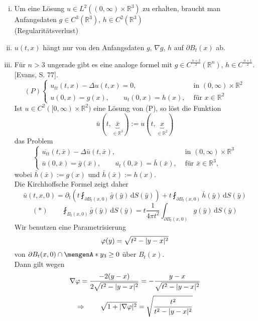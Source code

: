 \begin{bemerkung}
	\begin{enumerate}[(i)]
		\item Um eine Lösung $u \in L^2((0,\infty) \times \mathbb{R}^3)$ zu erhalten, braucht man Anfangsdaten $g \in C^3(\mathbb{R}^3)$, $h \in C^2(\mathbb{R}^3)$ \\
		(Regularitätsverlust)
		\item $u(t,x)$ hängt nur von den Anfangsdaten $g$, $ \nabla g$, $h$ auf $\partial B_t(x)$ ab.
		\item Für $n>3$ ungerade gibt es eine analoge formel mit $g \in C^{\frac{n+3}{2}}(\mathbb{R}^n)$, $h \in C^{\frac{n+1}{2}}$. [Evans, S. 77].
		\[
			(P) \begin{cases}
				u_{tt}(t,x)- \Delta u(t,x) = 0, &\text{ in }(0, \infty) \times \mathbb{R}^2\\
				u(0,x) = g(x), \qquad u_t(0,x)= h(x), & \text{ für }x \in \mathbb{R}^2
			\end{cases}
		\]
		Ist $u \in C^2([0,\infty) \times \mathbb{R}^2)$ eine Lösung von (P), so löst die Funktion
		\[
			\bar{u} (t,\underset{\in  \mathbb{R}^3}{\underbrace{\bar{x}}}) := u(t,\underset{\in \mathbb{R}^2}{\underbrace{x}})
		\]
		das Problem
		\[
			\begin{cases}
				\overline{u_{tt}}(t,\bar{x})- \Delta \bar{u}(t,\bar{x}), &\text{ in }(0,\infty) \times \mathbb{R}^3\\
				\bar{u}(0,\bar{x})= \bar{g}(\bar{x}), \qquad \overline{u_t}(0,\bar{x}) = \bar{h}(\bar{x}), &\text{ für } \bar{x} \in \mathbb{R}^3,
			\end{cases}
		\]
		wobei $\bar{h}(\bar{x}):= g(x)$ und $\bar{h}(\bar{x}):= h(x)$. \\
		Die Kirchhoffsche Formel zeigt daher
		\[
			\bar{u}(t,x,0) = \partial_t \left( t \fint_{\partial B_t(x,0)}^{} \bar{g}(\bar{y}) \,\mathrm{d}S(\bar{y}) \right)
			+ t \fint_{\partial B_t(x,0)}^{} \bar{h}(\bar{y}) \,\mathrm{d}S(\bar{y}) 
		\]
		\[
			(*) \qquad \fint_{B_t(x,0)}^{} \bar{g}(\bar{y}) \,\mathrm{d}S( \bar{ y}) 
			= t \frac{1}{4 \pi t^2} \int_{\partial B_t(x,0)}^{} g( \bar{y}) \,\mathrm{d}S( \bar{y})
		\]
		Wir benutzen eine Parametrisierung 
		\[
			\varphi(y) = \sqrt{t^2 - \lvert y-x\rvert^2}
		\]
		von $ \partial B_t(x,0) \cap \set{y_3 \geq 0}$ über $B_t(x)$. \\
		Dann gilt wegen
		\[
			 \nabla \varphi = \frac{-2 (y-x)}{2 \sqrt{t^2-\lvert y-x\rvert^2}} = - \frac{y-x}{\sqrt{t^2-\lvert y-x\rvert^2}}
		\]
		\[
			\Rightarrow \qquad \sqrt{1+ \lvert \nabla \varphi\rvert^2} = \sqrt{\frac{t^2}{t^2-\lvert y-x\rvert^2}}
\]
\end{enumerate}
\end{bemerkung}
